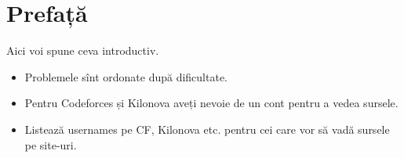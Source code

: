 \chapter*{Prefață}

Aici voi spune ceva introductiv.

\begin{itemize}
  \item Problemele sînt ordonate după dificultate.
  \item Pentru Codeforces și Kilonova aveți nevoie de un cont pentru a vedea sursele.
  \item Listează usernames pe CF, Kilonova etc. pentru cei care vor să vadă sursele pe site-uri.
\end{itemize}
